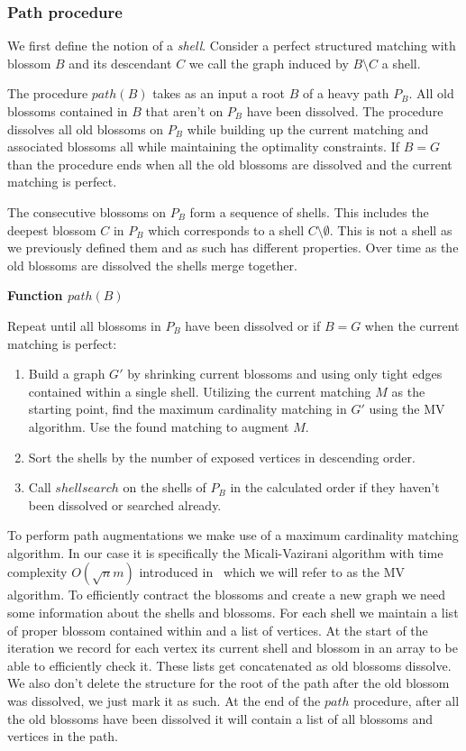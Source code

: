 \subsubsection{Path procedure}

We first define the notion of a \textit{shell}. Consider a perfect structured matching with blossom $B$ and its descendant $C$ we call the graph induced by $B \setminus C$ a shell.

The procedure $path(B)$ takes as an input a root $B$ of a heavy path $P_B$. All old blossoms contained in $B$ that aren't on $P_B$ have been dissolved. The procedure dissolves all old blossoms on $P_B$ while building up the current matching and associated blossoms all while maintaining the optimality constraints. If $B = G$ than the procedure ends when all the old blossoms are dissolved and the current matching is perfect.

The consecutive blossoms on $P_B$ form a sequence of shells. This includes the deepest blossom $C$ in $P_B$ which corresponds to a shell $C \setminus \emptyset$. This is not a shell as we previously defined them and as such has different properties. Over time as the old blossoms are dissolved the shells merge together.

\textbf{Function $path(B)$}

Repeat until all blossoms in $P_B$ have been dissolved or if $B = G$ when the current matching is perfect:
\begin{enumerate}
    \item Build a graph $G'$ by shrinking current blossoms and using only tight edges contained within a single shell. Utilizing the current matching $M$ as the starting point, find the maximum cardinality matching in $G'$ using the MV algorithm. Use the found matching to augment $M$.
    \item Sort the shells by the number of exposed vertices in descending order.
    \item Call $shellsearch$ on the shells of $P_B$ in the calculated order if they haven't been dissolved or searched already.
\end{enumerate}

To perform path augmentations we make use of a maximum cardinality matching algorithm. In our case it is specifically the Micali-Vazirani algorithm with time complexity $O(\sqrt{n}m)$ introduced in~\cite{micali1980v} which we will refer to as the MV algorithm. To efficiently contract the blossoms and create a new graph we need some information about the shells and blossoms. For each shell we maintain a list of proper blossom contained within and a list of vertices. At the start of the iteration we record for each vertex its current shell and blossom in an array to be able to efficiently check it. These lists get concatenated as old blossoms dissolve. We also don't delete the structure for the root of the path after the old blossom was dissolved, we just mark it as such. At the end of the $path$ procedure, after all the old blossoms have been dissolved it will contain a list of all blossoms and vertices in the path.

